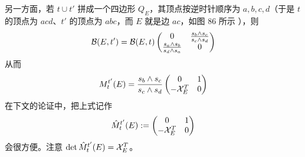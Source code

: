 另一方面，若 $t\cup t'$ 拼成一个四边形 $Q_E$，其顶点按逆时针顺序为 $a,b,c,d$（于是 $t$ 的顶点为 $acd$、$t'$ 的顶点为 $abc$，而 $E$ 就是边 $ac$，如图 86 所示%
），则
\begin{equation}
\mathcal{B}(E,t') = \mathcal{B}(E,t)\begin{pmatrix} 0 & \frac{s_b \wedge s_c}{s_c \wedge
s_d} \\ \frac{s_a \wedge s_b}{s_d \wedge s_a} & 0 \end{pmatrix}
\end{equation}
从而
\begin{equation}\label{eq:M-edge-matrix}
M_{t}^{t'}(E) =\frac{s_b \wedge s_c}{s_c \wedge s_d} \begin{pmatrix}
0 & 1 \\ - \mathcal{X}_E^T & 0 \end{pmatrix}
\end{equation}
在下文的论证中，把上式记作
\begin{equation}
\hat M_{t}^{t'}(E) :=
\begin{pmatrix} 0 & 1 \\ - \mathcal{X}_E^T & 0 \end{pmatrix}
\end{equation}
会很方便。注意 $\det \hat M_{t}^{t'}(E) = \mathcal{X}_E^T$。


